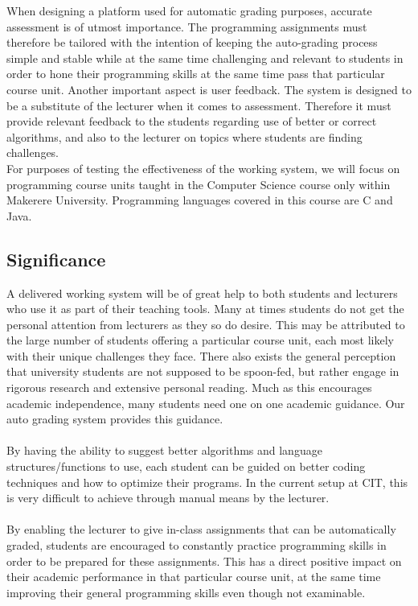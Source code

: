 \documentclass[12pt]{article}
\begin{document}
		\noindent When designing a platform used for automatic grading purposes, accurate assessment is of utmost importance. The programming assignments must therefore be tailored with the intention of keeping the auto-grading process simple and stable while at the same time challenging and relevant to students in order to hone their programming skills at the same time pass that particular course unit. Another important aspect is user feedback. The system is designed to be a substitute of the lecturer when it comes to assessment. Therefore it must provide relevant feedback to the students regarding use of better or correct algorithms, and also to the lecturer on topics where students are finding challenges.\\
		
		\noindent For purposes of testing the effectiveness of the working system, we will focus on
		programming course units taught in the Computer Science course only within Makerere
		University. Programming languages covered in this course are C and Java.

	\subsection{Significance}
			A delivered working system will be of great help to both students and lecturers who use it
		as part of their teaching tools. Many at times students do not get the personal attention
		from lecturers as they so do desire. This may be attributed to the large number of students
		offering a particular course unit, each most likely with their unique challenges they face.
		There also exists the general perception that university students are not supposed to be
		spoon-fed, but rather engage in rigorous research and extensive personal reading. Much
		as this encourages academic independence, many students need one on one academic
		guidance. Our auto grading system provides this guidance. \\ \\
			By having the ability to suggest better algorithms and language structures/functions to use,
		each student can be guided on better coding techniques and how to optimize their programs. In the current setup at 				CIT, this is very difficult to achieve through manual means by the lecturer. \\ \\
			By enabling the lecturer to give in-class assignments that can be automatically graded,
		students are encouraged to constantly practice programming skills in order to be prepared
		for these assignments. This has a direct positive impact on their academic performance in
		that particular course unit, at the same time improving their general programming skills
		even though not examinable. 
\end{document}
